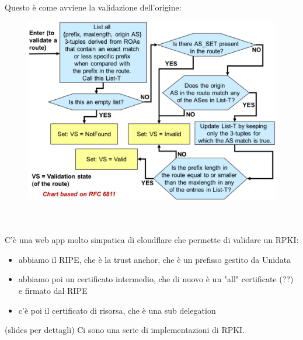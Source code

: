 \documentclass[12pt, oneside]{extbook} %
\begin{document}
\\Questo è come avviene la validazione dell'origine:\\
\begin{figure}[h!]
    \centering
    \includegraphics[scale=0.5]{../../immagini/orig_valid}
\end{figure}\\\\
C'è una web app molto simpatica di cloudflare che permette di validare un RPKI:
\begin{itemize}
	\item abbiamo il RIPE, che è la trust anchor, che è un prefisso gestito da Unidata
	\item abbiamo poi un certificato intermedio, che di nuovo è un "all" certificate (??) e firmato dal RIPE
	\item c'è poi il certificato di risorsa, che è una sub delegation
\end{itemize}
(slides per dettagli)
Ci sono una serie di implementazioni di RPKI.
\end{document}

